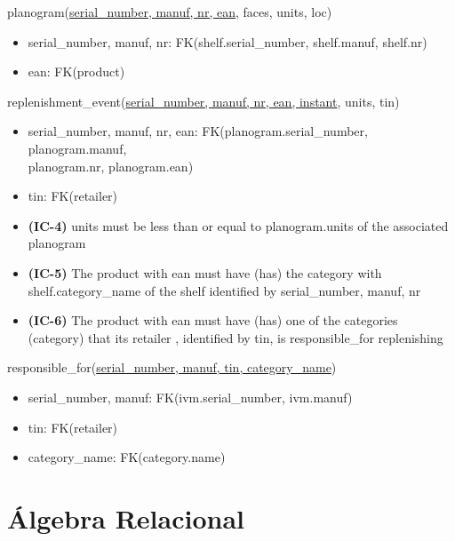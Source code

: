 \documentclass[12pt,a4paper]{article}
\begin{document}
  \vspace*{10pt}

  \noindent
  planogram(\underline{serial\_number, manuf, nr, ean}, faces, units, loc)
  \begin{itemize}[nosep]
    \item serial\_number, manuf, nr: FK(shelf.serial\_number, shelf.manuf, shelf.nr)
    \item ean: FK(product)
  \end{itemize}

  \vspace*{10pt}

  \noindent
  replenishment\_event(\underline{serial\_number, manuf, nr, ean, instant}, units, tin)
  \begin{itemize}[nosep]
    \item serial\_number, manuf, nr, ean: FK(planogram.serial\_number, planogram.manuf,\\ planogram.nr, planogram.ean)
    \item tin: FK(retailer)
    \item \textsf{\textbf{(IC-4)}} units \textsf{must be less than or equal to} planogram.units \textsf{of the associated} planogram
    \item \textsf{\textbf{(IC-5)} The product with} ean \textsf{must have} (has) \textsf{the} category \textsf{with} shelf.category\_name \textsf{of the} shelf \textsf{identified by} serial\_number, manuf, nr
    \item \textsf{\textbf{(IC-6)} The product with} ean \textsf{must have} (has) \textsf{one of the categories} (category) \textsf{that its} retailer \textsf{, identified by} tin\textsf{, is} responsible\_for \textsf{replenishing}
    \end{itemize}

  \vspace*{10pt}

  \noindent
  responsible\_for(\underline{serial\_number, manuf, tin, category\_name})
  \begin{itemize}[nosep]
    \item serial\_number, manuf: FK(ivm.serial\_number, ivm.manuf)
    \item tin: FK(retailer)
    \item category\_name: FK(category.name)
  \end{itemize}

  \sffamily
  \section*{Álgebra Relacional}
\end{document}
